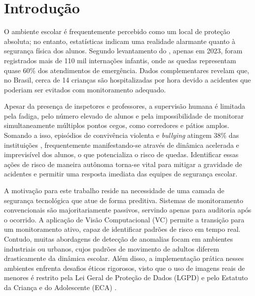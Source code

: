 \documentclass[12pt]{article}
\begin{document}
\section{Introdução} \label{introducao}

O ambiente escolar é frequentemente percebido como um local de proteção absoluta; no entanto, 
estatísticas indicam uma realidade alarmante quanto à segurança física dos alunos. Segundo
levantamento do \cite{aldeias:24}, apenas em 2023, foram registrados mais de 110 mil internações
infantis, onde as quedas representam quase 60\% dos atendimentos de emergência. Dados complementares
\cite{agenciabrasil:25} revelam que, no Brasil, cerca de 14 crianças são hospitalizadas por hora 
devido a acidentes que poderiam ser evitados com monitoramento adequado.

Apesar da presença de inspetores e professores, a supervisão humana é limitada pela fadiga, pelo
número elevado de alunos e pela impossibilidade de monitorar simultaneamente múltiplos pontos cegos,
como corredores e pátios amplos. Somando a isso, episódios de convivência violenta e \textit{bullying}
atingem 38\% das instituições \cite{abrace:25}, frequentemente manifestando-se através de dinâmica
acelerada e imprevisível dos alunos, o que potencializa o risco de quedas. Identificar essas ações de 
risco de maneira autônoma torna-se vital para mitigar a gravidade de acidentes e permitir uma resposta
imediata das equipes de segurança escolar.

A motivação para este trabalho reside na necessidade de uma camada de segurança tecnológica que atue de
forma preditiva. Sistemas de monitoramento convencionais são majoritariamente passivos, servindo apenas
para auditoria após o ocorrido. A aplicação de Visão Computacional (VC) permite a transição para um 
monitoramento ativo, capaz de identificar padrões de risco em tempo real. Contudo, muitas abordagens de
detecção de anomalias focam em ambientes industriais ou urbanos, cujos padrões de movimento de adultos
diferem drasticamente da dinâmica escolar. Além disso, a implementação prática nesses ambientes enfrenta
desafios éticos rigorosos, visto que o uso de imagens reais de menores é restrito pela Lei Geral de
Proteção de Dados (LGPD) \cite{lgpd:18} e pelo Estatuto da Criança e do Adolescente (ECA) \cite{eca:90}.
\end{document}
